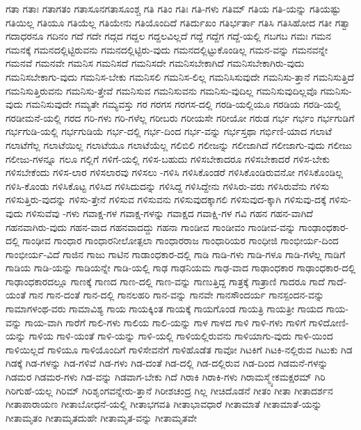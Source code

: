 {ಗತಾ
ಗತಾಃ
ಗತಾಗತಂ
ಗತಾಸೂನಗತಾಸೂಂಶ್ಚ
ಗತಿ
ಗತಿಂ
ಗತಿಃ
ಗತಿ-ಗಳು
ಗತಿಮ್
ಗತಿಯ
ಗತಿ-ಯನ್ನು
ಗತಿಯಷ್ಟು
ಗತಿಯಿಲ್ಲ
ಗತಿಯೂ
ಗತಿಯೆಲ್ಲ
ಗತಿಯೇನು
ಗತಿಯೊಂದಿದೆ
ಗತಿರ್ದುಖಂ
ಗತಿರ್ಭರ್ತಾ
ಗತಿಸಿ
ಗತಿಸಿಹೋದ
ಗತೀ
ಗತ್ವಾ
ಗದಾಧರನೂ
ಗದಿನಂ
ಗದೆ
ಗದೇ
ಗದ್ಗದ
ಗದ್ದಲ
ಗದ್ದಲವಿಲ್ಲದೆ
ಗದ್ದೆ
ಗದ್ದೆಗ
ಗದ್ದೆ-ಯಲ್ಲಿ
ಗಬಗಬ
ಗಮಃ
ಗಮನ
ಗಮನಕ್ಕೆ
ಗಮನದಲ್ಲಿಟ್ಟಿರುವನು
ಗಮನದಲ್ಲಿಟ್ಟಿರು-ವುದು
ಗಮನದಲ್ಲಿಟ್ಟುಕೊಂಡಿಲ್ಲ
ಗಮನ-ವನ್ನು
ಗಮನವನ್ನೇ
ಗಮನವೆ
ಗಮನವೇ
ಗಮನಿಸ
ಗಮನಿಸದೆ
ಗಮನಿಸದೇ
ಗಮನಿಸಬೇಕಾಗಿದೆ
ಗಮನಿಸಬೇಕಾಗಿರು-ವುದು
ಗಮನಿಸಬೇಕಾಗು-ವುದು
ಗಮನಿಸ-ಬೇಕು
ಗಮನಿಸಲಿ
ಗಮನಿಸ-ಲಿಲ್ಲ
ಗಮನಿಸಿಸುವುದೇ
ಗಮನಿಸು-ತ್ತಾನೆ
ಗಮನಿಸುತ್ತಿದೆ
ಗಮನಿಸುತ್ತಿರುವನು
ಗಮನಿಸು-ತ್ತೇವೆ
ಗಮನಿಸುವ
ಗಮನಿಸುವನು
ಗಮನಿಸು-ವುದಿಲ್ಲ
ಗಮನಿಸುವುದಿಲ್ಲವೊ
ಗಮನಿಸು-ವುದು
ಗಮನಿಸುವುದೇ
ಗಮ್ಯತೇ
ಗಮ್ಯವಸ್ತು
ಗರ
ಗರಗಸ
ಗರಗಸ-ದಲ್ಲಿ
ಗರಡಿ-ಯಲ್ಲಿಯೂ
ಗರಡಿಯ
ಗರಡಿ-ಯಲ್ಲಿ
ಗರಡೀಮನೆ-ಯಲ್ಲಿ
ಗರದ
ಗರಿ-ಗಳು
ಗರಿ-ಗಳೆಲ್ಲ
ಗರೀಬರು
ಗರೀಯಸೇ
ಗರೀಯೋ
ಗರುಡ
ಗರ್ಭ
ಗರ್ಭಂ
ಗರ್ಭಗುಡಿಗೆ
ಗರ್ಭಗುಡಿ-ಯಲ್ಲಿ
ಗರ್ಭಗುಡಿಯೆ
ಗರ್ಭ-ದಲ್ಲಿ
ಗರ್ಭ-ದಿಂದ
ಗರ್ಭ-ವನ್ನು
ಗರ್ಭಸ್ತಥಾ
ಗರ್ಭಿಣಿ-ಯಾದ
ಗಲಾಟೆ
ಗಲಾಟೆಗೆಲ್ಲ
ಗಲಾಟೆಯಿಲ್ಲ
ಗಲಾಟೆಯೂ
ಗಲಾಟೆಯೆಲ್ಲ
ಗಲಿಬಿಲಿ
ಗಲೀಜನ್ನು
ಗಲೀಜಾಗಿದೆ
ಗಲೀಜಾಗು-ವುದು
ಗಲೀಜು
ಗಲೀಜು-ಗಳನ್ನೂ
ಗಲೂ
ಗಲ್ಲಿಗೆ
ಗಳಿಗೆ-ಯಲ್ಲಿ
ಗಳಿಸ-ಬಹುದು
ಗಳಿಸಬೇಕಾದರೂ
ಗಳಿಸಬೇಕಾದರೆ
ಗಳಿಸ-ಬೇಕು
ಗಳಿಸಬೇಕೆಂದು
ಗಳಿಸ-ಲಾರ
ಗಳಿಸಲಾರವು
ಗಳಿಸಲು
-ಗಳಿಸಿ
ಗಳಿಸಿಕೊಂಡರೆ
ಗಳಿಸಿಕೊಂಡಿರುವನೋ
ಗಳಿಸಿಕೊಂಡಿಲ್ಲ
ಗಳಿಸಿ-ಕೊಂಡು
ಗಳಿಸಿಕೊಟ್ಟ
ಗಳಿಸಿದ
ಗಳಿಸಿದುದನ್ನು
ಗಳಿಸಿದ್ದ
ಗಳಿಸಿದ್ದೇನು
ಗಳಿಸಿರು-ವರು
ಗಳಿಸಿರುವೆನು
ಗಳಿಸು
ಗಳಿಸುತ್ತಿರು-ವುದನ್ನು
ಗಳಿಸು-ತ್ತೇನೆ
ಗಳಿಸುವ
ಗಳಿಸುವನು
ಗಳಿಸುವುದಕ್ಕಾಗಲಿ
ಗಳಿಸುವುದ-ಕ್ಕಾಗಿ
ಗಳಿಸುವು-ದಕ್ಕೆ
ಗಳಿಸು-ವುದು
ಗಳಿಸುವೆವು
-ಗಳು
ಗವಾಕ್ಷ-ಗಳ
ಗವಾಕ್ಷ-ಗಳನ್ನು
ಗವಾಕ್ಷದ
ಗವಾಕ್ಷಿ-ಗಳ
ಗವಿ
ಗಹನ
ಗಹನ-ವಾಗಿದೆ
ಗಹನವಾಗಿರು-ವುದು
ಗಹನ-ವಾದ
ಗಹನವಾದದ್ದು
ಗಹನಾ
ಗಾಂಡೀವ
ಗಾಂಡೀವಂ
ಗಾಂಡೀವ-ವನ್ನು
ಗಾಂಢಾಂಧಕಾರ-ದಲ್ಲಿ
ಗಾಂಢೀವ
ಗಾಂಧಾರ
ಗಾಂಧಾರನೀಲೋತ್ಪಲಾ
ಗಾಂಧಾರರಾಜ
ಗಾಂಧಾರಿಯರ
ಗಾಂಧೀಜಿ
ಗಾಂಭೀರ್ಯ-ದಿಂದ
ಗಾಂಭೀರ್ಯ-ವಿದೆ
ಗಾಜಿನ
ಗಾಜು
ಗಾಟಿನ
ಗಾಡಾಂಧಕಾರ-ದಲ್ಲಿ
ಗಾಡಿ
ಗಾಡಿ-ಗಳು
ಗಾಡಿ-ಗಳೂ
ಗಾಡಿ-ಗಳೆಲ್ಲ
ಗಾಡಿಗೆ
ಗಾಡಿಯ
ಗಾಡಿ-ಯನ್ನು
ಗಾಡಿಯನ್ನೇ
ಗಾಡಿ-ಯಲ್ಲಿ
ಗಾಢ
ಗಾಢನಿಯಮ
ಗಾಢ-ವಾದ
ಗಾಢಾಂಧಕಾರ
ಗಾಢಾಂಧಕಾರ-ದಲ್ಲಿ
ಗಾಢಾಂಧಕಾರದಲ್ಲೂ
ಗಾಣಕ್ಕೆ
ಗಾಣದ
ಗಾಣ-ದಲ್ಲಿ
ಗಾಣ-ವನ್ನು
ಗಾಣುತ್ತಿದ್ದ
ಗಾತ್ರಕ್ಕೆ
ಗಾತ್ರಾಣಿ
ಗಾದರೂ
ಗಾದೆ
ಗಾದೆ-ಯಂತೆ
ಗಾನ
ಗಾನ-ದಂತೆ
ಗಾನ-ದಲ್ಲಿ
ಗಾನಲಹರಿ
ಗಾನ-ವನ್ನು
ಗಾನವೇ
ಗಾನಸೌಂದರ್ಯ
ಗಾನಸ್ಪಂದನ-ವನ್ನು
ಗಾಮಾಗಳಂಥ-ವರು
ಗಾಮಾವಿಶ್ಯ
ಗಾಯ
ಗಾಯಕ್ಕಿಂತ
ಗಾಯಕ್ಕೆ
ಗಾಯಗೊಂಡ
ಗಾಯತ್ರಿ
ಗಾಯತ್ರೀ
ಗಾಯದ
ಗಾಯ-ವನ್ನು
ಗಾಯ-ವಾಗಿ
ಗಾರೆಗೆ
ಗಾಲಿ-ಗಳು
ಗಾಲಿಯ
ಗಾಲಿ-ಯನ್ನು
ಗಾಳ
ಗಾಳದ
ಗಾಳಿ
ಗಾಳಿ-ಗಳು
ಗಾಳಿಗೆ
ಗಾಳಿದೋಣಿ-ಯನ್ನು
ಗಾಳಿಯ
ಗಾಳಿ-ಯಂತೆ
ಗಾಳಿ-ಯನ್ನು
ಗಾಳಿ-ಯಲ್ಲಿ
ಗಾಳಿಯಲ್ಲಿರುವನು
ಗಾಳಿಯಾಗು-ವುದು
ಗಾಳಿ-ಯಿಂದ
ಗಾಳಿಯಿಲ್ಲದೆ
ಗಾಳಿಯೂ
ಗಾಳಿಯೊಂದಿಗೆ
ಗಾಳಿಸೇವನೆಗೆ
ಗಾಳಿಹೊಡೆತ
ಗಾವೋ
ಗಿಟಕಿಗೆ
ಗಿಟಕಿ-ನಲ್ಲಿರುವ
ಗಿಟುಕು
ಗಿಡ
ಗಿಡಕ್ಕೆ
ಗಿಡ-ಗಳನ್ನು
ಗಿಡ-ಗಳಿವೆ
ಗಿಡ-ಗಳು
ಗಿಡ-ದಂತೆ
ಗಿಡ-ದಲ್ಲಿ
ಗಿಡ-ದಲ್ಲಿರುವ
ಗಿಡ-ದಿಂದ
ಗಿಡಮನೆ-ಗಳನ್ನು
ಗಿಡಮರ
ಗಿಡಮರ-ಗಳು
ಗಿಡ-ವನ್ನು
ಗಿಡವಾಗ-ಬೇಕು
ಗಿದೆ
ಗಿರಾಕಿ
ಗಿರಾಕಿ-ಗಳು
ಗಿರಾಮಸ್ಮ್ಯೇಕಮಕ್ಷರಮ್
ಗಿರಿ
ಗಿರಿಗುಹೆ-ಯಲ್ಲ
ಗಿರಿಮ್
ಗಿರಿಶೃಂಗವನ್ನೇರು-ತ್ತಾನೆ
ಗಿರೀಶಚಂದ್ರ
ಗಿಲ್ಲ
ಗೀಚಿದೊಡನೆ
ಗೀತಂ
ಗೀತಾ
ಗೀತಾದರ್ಶನ
ಗೀತಾಪಾರಾಯಣ
ಗೀತಾಬೋಧನೆ-ಯಲ್ಲಿ
ಗೀತಾಭಗವತಿ
ಗೀತಾಭಾವಧಾರೆ
ಗೀತಾಮಾತೆ
ಗೀತಾಮಾತೆ-ಯನ್ನು
ಗೀತಾಮೃತಂ
ಗೀತಾಮೃತದುಹೇ
ಗೀತಾಮೃತ-ವನ್ನು
ಗೀತಾಮೃತವೇ
}
